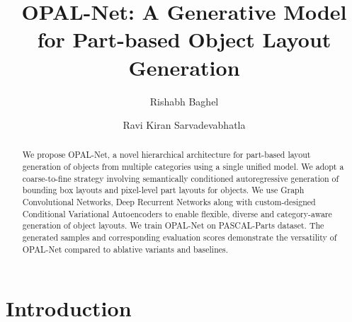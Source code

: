 \documentclass[runningheads]{llncs}
\begin{document}
\pagestyle{headings}
\mainmatter

\title{OPAL-Net: A Generative Model for Part-based Object Layout Generation}


\author{Rishabh Baghel \and
Ravi Kiran Sarvadevabhatla }

\maketitle

\begin{abstract}
We propose OPAL-Net, a novel hierarchical architecture for part-based layout generation of objects from multiple categories using a single unified model. We adopt a coarse-to-fine strategy involving semantically conditioned autoregressive generation of bounding box layouts and pixel-level part layouts for objects. We use Graph Convolutional Networks, Deep Recurrent Networks along with custom-designed Conditional Variational Autoencoders to enable flexible, diverse and category-aware generation of object layouts. We train OPAL-Net on PASCAL-Parts dataset. The generated samples and corresponding evaluation scores demonstrate the versatility of OPAL-Net compared to ablative variants and baselines.
\end{abstract}

\section{Introduction}
\end{document}
